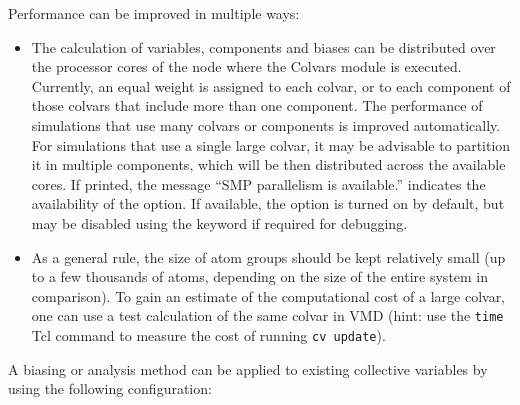 Performance can be improved in multiple ways:
\begin{itemize}
\item The calculation of variables, components and biases can be distributed over the processor cores of the node where the Colvars module is executed.
  Currently, an equal weight is assigned to each colvar, or to each component of those colvars that include more than one component.
  The performance of simulations that use many colvars or components is improved automatically.
  For simulations that use a single large colvar, it may be advisable to partition it in multiple components, which will be then distributed across the available cores.
  If printed, the message ``SMP parallelism is available.'' indicates the availability of the option.
  If available, the option is turned on by default, but may be disabled using the keyword  if required for debugging.


\item As a general rule, the size of atom groups should be kept relatively small (up to a few thousands of atoms, depending on the size of the entire system in comparison).
To gain an estimate of the computational cost of a large colvar, one can use a test calculation of the same colvar in VMD (hint: use the \texttt{time} Tcl command to measure the cost of running \texttt{cv update}).
\end{itemize}



A biasing or analysis method can be applied to existing collective variables by using the following configuration:

